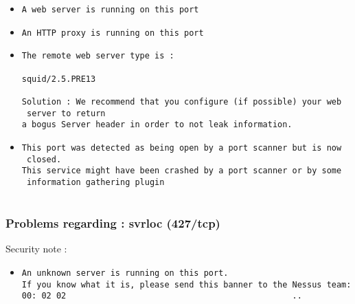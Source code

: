 \documentclass{article}
\begin{document}
\begin{itemize}
\item \begin{verbatim}
A web server is running on this port
\end{verbatim}\item \begin{verbatim}
An HTTP proxy is running on this port
\end{verbatim}\item \begin{verbatim}
The remote web server type is :

squid/2.5.PRE13

Solution : We recommend that you configure (if possible) your web
 server to return
a bogus Server header in order to not leak information.

\end{verbatim}\item \begin{verbatim}
This port was detected as being open by a port scanner but is now
 closed.
This service might have been crashed by a port scanner or by some
 information gathering plugin


\end{verbatim}\end{itemize}
\subsubsection{Problems regarding : svrloc (427/tcp)}
Security note :\\
\begin{itemize}
\item \begin{verbatim}
An unknown server is running on this port.
If you know what it is, please send this banner to the Nessus team:
00: 02 02                                              ..             
                             


\end{verbatim}\end{itemize}
\end{document}
